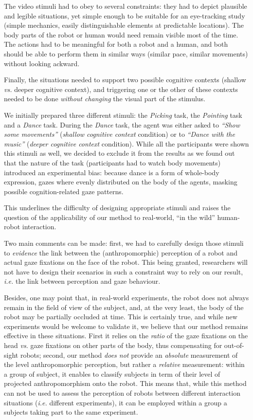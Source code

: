 \documentclass[lettersize, noapacite, twoside, HRI]{apa_HRI}
\newcommand{\ie}{\textit{i.e.}\xspace}
\newcommand{\vs}{\textit{vs.}\xspace}
\begin{document}
The video stimuli had to obey to several constraints: they had to depict
plausible and legible situations, yet simple enough to be suitable for an
eye-tracking study (simple mechanics, easily distinguishable elements at
predictable locations). The body parts of the robot or human would need remain
visible most of the time. The actions had to be meaningful for both a robot and
a human, and both should be able to perform them in similar ways (similar pace,
similar movements) without looking ackward.

Finally, the situations needed to support two possible cognitive contexts
(shallow \vs deeper cognitive context), and triggering one or the other of these
contexts needed to be done \emph{without changing} the visual part of the
stimulus.

We initially prepared three different stimuli: the \emph{Picking} task, the
\emph{Pointing} task and a \emph{Dance} task.  During the \emph{Dance} task, the
agent was either asked to \emph{``Show some movements''} (\emph{shallow
cognitive context} condition) or to \emph{``Dance with the music''}
(\emph{deeper cognitive context} condition). While all the participants were
shown this stimuli as well, we decided to exclude it from the results as we
found out that the nature of the task (participants had to watch body movements)
introduced an experimental bias: because dance is a form of whole-body
expression, gazes where evenly distributed on the body of the agents, masking
possible cognition-related gaze patterns.

This underlines the difficulty of designing appropriate stimuli and raises the
question of the applicability of our method to real-world, ``in the wild''
human-robot interaction.

Two main comments can be made: first, we had to carefully design those stimuli
to \emph{evidence} the link between the (anthropomorphic) perception of a robot
and actual gaze fixations on the face of the robot. This being granted,
researchers will not have to design their scenarios in such a constraint way to
rely on our result, \ie the link between perception and gaze behaviour.

Besides, one may point that, in real-world experiments, the robot does not
always remain in the field of view of the subject, and, at the very least, the
body of the robot may be partially occluded at time.  This is certainly true,
and while new experiments would be welcome to validate it, we believe that our
method remains effective in these situations. First it relies on the
\emph{ratio} of the gaze fixations on the head \vs gaze fixations on other parts
of the body, thus compensating for out-of-sight robots; second, our method
\emph{does not} provide an \emph{absolute} measurement of the level
anthropomorphic perception, but rather a \emph{relative} measurement: within a
group of subject, it enables to classify subjects in term of their level of
projected anthropomorphism onto the robot.  This means that, while this method
can not be used to assess the perception of robots between different interaction
situations (\ie different experiments), it can be employed within a group a
subjects taking part to the same experiment.
\end{document}
